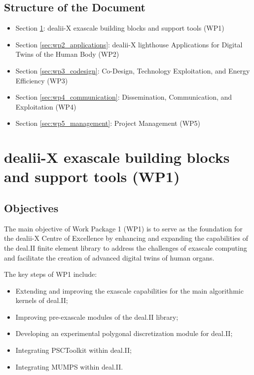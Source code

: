 \documentclass[a4paper,12pt, numbers]{article}
\begin{document}
	\subsection{{Structure of the Document}}
	\begin{itemize}
		\item Section \ref{sec:wp1_dealii}: dealii-X exascale building blocks and support tools (WP1)
		\item Section \ref{sec:wp2_applications}: dealii-X lighthouse Applications for Digital Twins of the Human Body (WP2)
		\item Section \ref{sec:wp3_codesign}: Co-Design, Technology Exploitation, and Energy Efficiency (WP3)
		\item Section \ref{sec:wp4_communication}: Dissemination, Communication, and Exploitation (WP4)
		\item Section \ref{sec:wp5_management}: Project Management (WP5)
	\end{itemize}
	
	\newpage
	
	\section{{dealii-X exascale building blocks and support tools (WP1)}}
	\label{sec:wp1_dealii}
	
	\subsection{Objectives}
	
	The main objective of Work Package 1 (WP1) is to serve as the foundation
	for the dealii-X Centre of Excellence by enhancing and expanding the
	capabilities of the deal.II finite element library to address the challenges of exascale
	computing and facilitate the creation of advanced digital twins of human
	organs.
	
	The key steps of WP1 include:
	\begin{itemize}
        \item Extending and improving the exascale capabilities for the main
          algorithmic kernels of deal.II;
		\item Improving pre-exascale modules of the deal.II library;
		\item Developing an experimental polygonal discretization module for deal.II;
		\item Integrating PSCToolkit within deal.II;
		\item Integrating MUMPS within deal.II.
	\end{itemize}
	
\end{document}
